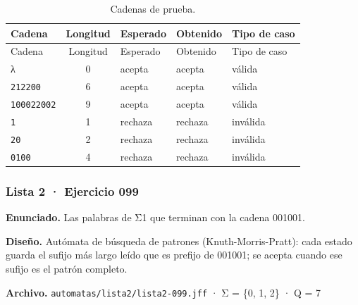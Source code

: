 \begin{longtable}[]{@{}lclll@{}}
\caption{Cadenas de prueba.}\tabularnewline
\toprule\noalign{}
Cadena & Longitud & Esperado & Obtenido & Tipo de caso \\
\midrule\noalign{}
\endfirsthead
\toprule\noalign{}
Cadena & Longitud & Esperado & Obtenido & Tipo de caso \\
\midrule\noalign{}
\endhead
\bottomrule\noalign{}
\endlastfoot
λ & 0 & acepta & acepta & válida \\
\texttt{212200} & 6 & acepta & acepta & válida \\
\texttt{100022002} & 9 & acepta & acepta & válida \\
\texttt{1} & 1 & rechaza & rechaza & inválida \\
\texttt{20} & 2 & rechaza & rechaza & inválida \\
\texttt{0100} & 4 & rechaza & rechaza & inválida \\
\end{longtable}


\hypertarget{lista-2-ejercicio-099}{%
\subsubsection{Lista 2 · Ejercicio 099}\label{lista-2-ejercicio-099}}

\textbf{Enunciado.} Las palabras de Σ1 que terminan con la cadena 001001.

\textbf{Diseño.} Autómata de búsqueda de patrones (Knuth-Morris-Pratt): cada estado guarda el sufijo más largo leído que es prefijo de 001001; se acepta cuando ese sufijo es el patrón completo.

\textbf{Archivo.} \texttt{automatas/lista2/lista2-099.jff} · Σ = \{0, 1, 2\} · \textbar Q\textbar{} = 7

